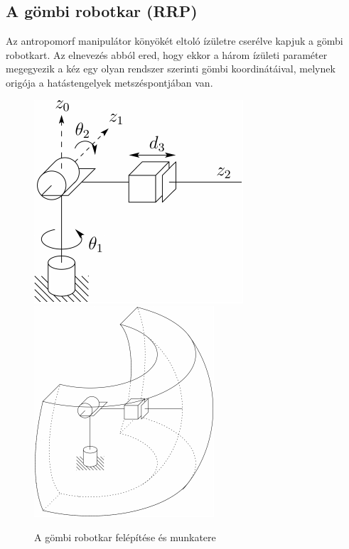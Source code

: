 \documentclass[12pt,a4paper]{report}
\theoremstyle{remark}
\theoremstyle{definition}
\begin{document}
\subsection{A gömbi robotkar (RRP)}
Az antropomorf manipulátor könyökét eltoló ízületre cserélve kapjuk a gömbi robotkart. Az elnevezés abból ered, hogy 
ekkor a három ízületi paraméter megegyezik a kéz egy olyan rendszer szerinti gömbi koordinátáival, melynek origója a 
hatástengelyek metszéspontjában van.
\begin{figure}[h]
\centering
\includegraphics[width=0.35\linewidth]{./images/Spherical_manipulator}\hspace{1cm}
\includegraphics[width=0.35\linewidth]{./images/Spherical_workspace}
\caption{A gömbi robotkar felépítése és munkatere}
\end{figure}
\end{document}

